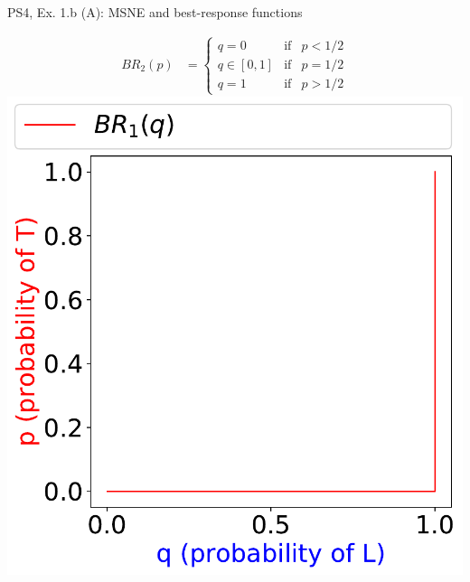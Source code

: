 \begin{frame}{PS4, Ex. 1.b (A): MSNE and best-response functions}
\begin{multicols}{2}
\begin{align*}
      BR_2(p)&=\left\{ \begin{array}{lcl}
          q=0       & \text{if} & p<1/2  \\
          q\in[0,1] & \text{if} & p=1/2 \\
          q=1       & \text{if} & p>1/2
      \end{array}\right.
    \end{align*}
    \vspace{-8pt}
    \includegraphics[width=\columnwidth]{figures/1b_}
  \vfill\null
  \end{multicols}
\end{frame}
